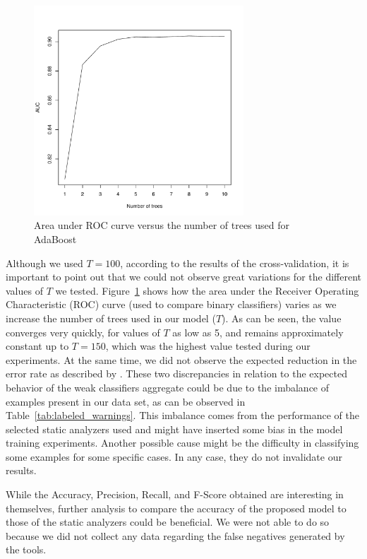 \begin{figure}[!h]
\centering
\includegraphics[width=0.7\textwidth]{figures/roc.pdf}
  \caption{Area under ROC curve versus the number of trees used for AdaBoost}\label{fig:roc}
\end{figure}


Although we used $T=100$, according to the results of the cross-validation, it is
important to point out that we could not observe great variations for the
different values of $T$ we tested. Figure~\ref{fig:roc} shows how the area
under the Receiver Operating Characteristic (ROC) curve (used to compare binary
classifiers) varies as we increase the number of trees used in our model ($T$).
As can be seen, the value converges very quickly, for values of $T$ as low as 5, and remains
approximately constant up to $T = 150$, which was the highest value tested
during our experiments. At the same time, we did not observe the expected
reduction in the error rate as described by \cite{freund1999short}.
These two discrepancies in relation to the expected behavior of the weak classifiers aggregate 
could be due to the imbalance of examples present
in our data set, as can be observed in Table~\ref{tab:labeled_warnings}. This
imbalance comes from the performance of the selected static analyzers used and
might have inserted some bias in the model training experiments. Another possible
cause might be
the difficulty in classifying some examples for some specific cases. In
any case, they do not invalidate our results.

While the Accuracy, Precision, Recall, and F-Score obtained are interesting
in themselves, 
further analysis to compare the accuracy of the proposed
model to those of the static analyzers could be beneficial. We were not
able to do so because we did not collect any data
regarding the false negatives generated by the tools.

